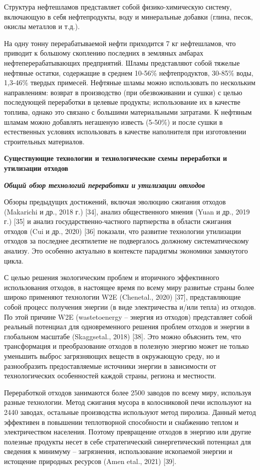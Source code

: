 Структура нефтешламов представляет собой физико-химическую систему,
включающую в себя нефтепродукты, воду и минеральные добавки (глина,
песок, окислы металлов и т.д.).

На одну тонну перерабатываемой нефти приходится 7 кг нефтешламов, что
приводит к большому скоплению последних в земляных амбарах
нефтеперерабатывающих предприятий. Шламы представляют собой тяжелые
нефтяные остатки, содержащие в среднем 10-56\% нефтепродуктов, 30-85\%
воды, 1,3-46\% твердых примесей. Нефтяные шламы можно использовать по
нескольким направлениям: возврат в производство (при обезвоживании и
сушки) с целью последующей переработки в целевые продукты; использование
их в качестве топлива, однако это связано с большими материальными
затратами. К нефтяным шламам можно добавлять негашеную известь (5-50\%)
и после сушки в естественных условиях использовать в качестве
наполнителя при изготовлении строительных материалов.

{\bfseries Существующие технологии и технологические схемы переработки и
утилизации отходов}

\emph{{\bfseries Общий обзор технологий переработки и утилизации отходов}}

Обзоры предыдущих достижений, включая эволюцию сжигания отходов
(Makarichi и др., 2018 г.) {[}34{]}, анализ общественного мнения (Yuan и
др., 2019 г.) {[}35{]} и анализ государственно-частного партнерства в
области сжигания отходов (Cui и др., 2020) {[}36{]} показали, что
развитие технологии утилизации отходов за последнее десятилетие не
подвергалось должному систематическому анализу. Это особенно актуально в
контексте парадигмы экономики замкнутого цикла.

С целью решения экологическим проблем и вторичного эффективного
использования отходов, в настоящее время по всему миру развитые страны
более широко применяют технологии W2E (Chenetal., 2020) {[}37{]},
представляющие собой процесс получения энергии (в виде электричества
и/или тепла) из отходов. По этой причине W2E (wastetoenergy -- энергия
из отходов) представляет собой реальный потенциал для одновременного
решения проблем отходов и энергии в глобальном масштабе (Skaggsetal.,
2018) {[}38{]}. Это можно объяснить тем, что трансформация и
преобразование отходов в полезную энергию может не только уменьшить
выброс загрязняющих веществ в окружающую среду, но и разнообразить
предоставляемые источники энергии в зависимости от технологических
особенностей каждой страны, региона и местности.

Переработкой отходов занимаются более 2500 заводов по всему миру,
используя разные технологии. Метод сжигания мусора в колосниковой печи
используют на 2440 заводах, остальные производства используют метод
пиролиза. Данный метод эффективен в повышении теплотворной способности и
снабжению теплом и электричеством населения. Поэтому превращение отходов
в энергию или другие полезные продукты несет в себе стратегический
синергетический потенциал для сведения к минимуму -- загрязнения,
использование ископаемой энергии и истощение природных ресурсов (Amen
etal., 2021) {[}39{]}.


